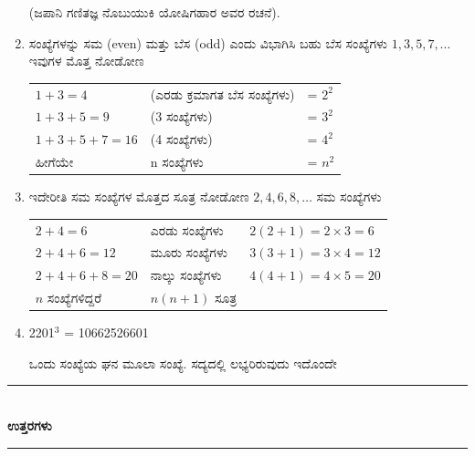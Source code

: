 \begin{enumerate}
\hfill (ಜಪಾನಿ ಗಣಿತಜ್ಞ ನೊಬುಯುಕಿ ಯೋಷಿಗಹಾರ ಅವರ ರಚನೆ).

\item ಸಂಖ್ಯೆಗಳನ್ನು ಸಮ (even) ಮತ್ತು ಬೆಸ (odd) ಎಂದು ವಿಭಾಗಿಸಿ ಬಹು ಬೆಸ ಸಂಖ್ಯೆಗಳು $1, 3, 5, 7, \ldots$ ಇವುಗಳ ಮೊತ್ತ ನೋಡೋಣ

\begin{tabular}{lll}
$1 + 3 = 4$ &(ಎರಡು ಕ್ರಮಾಗತ ಬೆಸ ಸಂಖ್ಯೆಗಳು) & = $2^{2}$\\
$1 + 3 + 5 = 9$ &(3 ಸಂಖ್ಯೆಗಳು) & = $3^{2}$\\
$1 + 3 + 5 + 7 = 16$ &(4 ಸಂಖ್ಯೆಗಳು) & = $4^{2}$\\
ಹೀಗೆಯೇ & n ಸಂಖ್ಯೆಗಳು & = $n^{2}$
\end{tabular}

\item ಇದೇರೀತಿ ಸಮ ಸಂಖ್ಯೆಗಳ ಮೊತ್ತದ ಸೂತ್ರ ನೋಡೋಣ $2, 4, 6, 8, \ldots$ ಸಮ ಸಂಖ್ಯೆಗಳು

\begin{tabular}{lll}
$2 + 4= 6$ & ಎರಡು ಸಂಖ್ಯೆಗಳು & $2(2 + 1) = 2 \times 3 = 6$\\
$2 + 4 + 6 = 12$ & ಮೂರು ಸಂಖ್ಯೆಗಳು & $3(3 + 1) = 3 \times 4 = 12$\\
$2 + 4 + 6 + 8 = 20$ &ನಾಲ್ಕು ಸಂಖ್ಯೆಗಳು & $4(4 + 1) = 4 \times 5 = 20$\\
$n$ ಸಂಖ್ಯೆಗಳಿದ್ದರೆ & $n(n + 1)$ ಸೂತ್ರ &
\end{tabular}

\item 2201$^{3}$ = 10662526601

ಒಂದು ಸಂಖ್ಯೆಯ ಘನ ಮೂಲಾ ಸಂಖ್ಯೆ. ಸದ್ಯದಲ್ಲಿ ಲಭ್ಯರಿರುವುದು ಇದೊಂದೇ
\end{enumerate}

\smallskip

\begin{center}
\rule{5cm}{1pt}\\[5pt]
{\Large\bfseries ಉತ್ತರಗಳು}\\[3pt]
\rule{5cm}{1pt}
\end{center}


